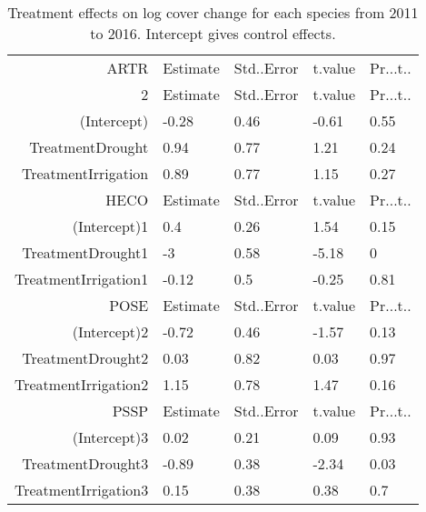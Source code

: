 \begin{table}[ht]
\centering
\caption{Treatment effects on log cover change for each species from 2011 to 2016. Intercept gives control effects.} 
\label{table:coverChange}
\begin{tabular}{rllll}
  \hline
ARTR & Estimate & Std..Error & t.value & Pr...t.. \\ 
  2 & Estimate & Std..Error & t.value & Pr...t.. \\ 
  (Intercept) & -0.28 & 0.46 & -0.61 & 0.55 \\ 
  TreatmentDrought & 0.94 & 0.77 & 1.21 & 0.24 \\ 
  TreatmentIrrigation & 0.89 & 0.77 & 1.15 & 0.27 \\ 
HECO & Estimate & Std..Error & t.value & Pr...t.. \\ 
  (Intercept)1 & 0.4 & 0.26 & 1.54 & 0.15 \\ 
  TreatmentDrought1 & -3 & 0.58 & -5.18 & 0 \\ 
  TreatmentIrrigation1 & -0.12 & 0.5 & -0.25 & 0.81 \\ 
POSE & Estimate & Std..Error & t.value & Pr...t.. \\ 
  (Intercept)2 & -0.72 & 0.46 & -1.57 & 0.13 \\ 
  TreatmentDrought2 & 0.03 & 0.82 & 0.03 & 0.97 \\ 
  TreatmentIrrigation2 & 1.15 & 0.78 & 1.47 & 0.16 \\ 
PSSP & Estimate & Std..Error & t.value & Pr...t.. \\ 
  (Intercept)3 & 0.02 & 0.21 & 0.09 & 0.93 \\ 
  TreatmentDrought3 & -0.89 & 0.38 & -2.34 & 0.03 \\ 
  TreatmentIrrigation3 & 0.15 & 0.38 & 0.38 & 0.7 \\ 
   \hline
\end{tabular}
\end{table}
